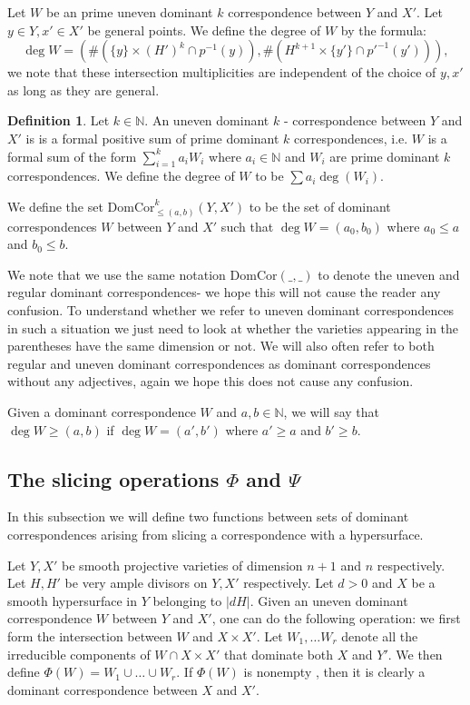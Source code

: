 \documentclass[12pt]{amsart}
\numberwithin{equation}{section}
\numberwithin{theorem}{section}
\theoremstyle{definition}
\theoremstyle{definition}
\newtheorem{definition}[theorem]{Definition}
\def\NN{{\mathbb N}}
\def \DC{{\mathrm{DomCor}}}
\begin{document}
Let $W$ be an prime uneven dominant $k$ correspondence between $Y$ and $X'$. Let $y \in Y , x' \in X'$ be general points. We define the degree of $W$  by the formula:
$$  \deg W = (\# (\{y\} \times (H')^k \cap p^{-1}(y)), \# (H^{k+1} \times \{y'\} \cap p'^{-1}(y'))),$$  we note that these intersection multiplicities are independent of the choice of $y,x'$ as long as they are general.

\begin{definition}
    Let $k \in \NN$.
    An uneven dominant $k$ - correspondence between $Y$ and $X'$ is is a formal positive sum of prime dominant $k$ correspondences, i.e. $W$ is a  formal sum of the form $\sum_{i=1}^k a_i W_i$ where $a_i \in \NN$ and $W_i$ are prime dominant $k$ correspondences. We define the degree of $W$ to be $\sum a_i \deg(W_i).$

    We define the set $\DC^k _{\le (a,b)} (Y, X')$ to be the set of dominant correspondences $W$ between $Y$ and $X'$ such that $\deg W = (a_0,b_0)$ where $a_0 \le a$ and $b_0 \le b$. 
\end{definition}

We note that we use the same notation $\DC (\_,\_)$ to denote the uneven and regular dominant correspondences- we hope this will not cause the reader any confusion. To understand whether we refer to uneven dominant correspondences in such a situation we just need to look at whether the varieties appearing in the parentheses have the same dimension or not. We will also often refer to both regular and uneven dominant correspondences as dominant correspondences without any adjectives, again we hope this does not cause any confusion. 


Given a dominant correspondence $W$ and $a,b \in \NN$, we will say that $\deg W \ge (a,b)$ if $\deg W = (a',b')$ where $a' \ge a$ and $b' \ge b$.

\subsection{The slicing operations $\Phi$ and $\Psi$}
 In this subsection we will define two functions between sets of dominant correspondences arising from slicing a correspondence with a hypersurface.

 Let $Y,X'$ be smooth projective varieties of dimension $n+1$ and $n$ respectively. Let $H, H'$ be very ample divisors on $Y, X'$ respectively. Let $d >0$ and $X$ be a smooth hypersurface in $Y$ belonging to $|dH|.$  Given an uneven dominant correspondence $W$ between $Y$ and $X'$, one can do the following operation: we first form the intersection between $W$ and $X \times X'$.
 Let $W_1 , \dots W_r$ denote all the irreducible components of $W \cap X \times X'$ that dominate both $X$ and $Y'$. We then define $\Phi(W) = W_1 \cup \dots \cup W_r$. If $\Phi(W)$ is nonempty , then it is clearly a dominant correspondence between $X$ and $X'.$
\end{document}
